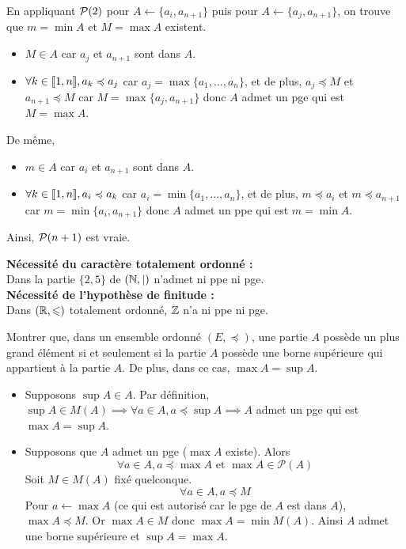 \documentclass{article}
\renewenvironment{question_kholle}[2][ ]
{
	\subsection{\texorpdfstring{#2}{}}
	\notblank{#1}
	{
		\noindent #1
		\bigbreak
	}
	{}
	\begin{proof}
}
{
	\end{proof}
}
\begin{document}
\begin{question_kholle}
\begin{itemize}
		      En appliquant $\mathcal P(2)$ pour $A\leftarrow \{a_{i}, a_{n+1}\}$ puis pour $A\leftarrow \{a_{j}, a_{n+1}\}$, on trouve que $m=\min A$ et $M=\max A$ existent.
		      \begin{itemize}
			      \item $M\in A$ car $a_{j}$ et $a_{n+1}$ sont dans $A$.
			      \item $\forall k\in[\![ 1,n ]\!], a_{k}\preccurlyeq a_{j}$ car $a_{j}=\max \{a_{1}, \dots , a_{n}\}$, et de plus, $a_{j}\preccurlyeq M$ et $a_{n+1}\preccurlyeq M$ car $M=\max\{a_{j}, a_{n+1}\}$ donc $A$ admet un pge qui est $M=\max A$.
		      \end{itemize}
		      De même,
		      \begin{itemize}
			      \item $m\in A$ car $a_{i}$ et $a_{n+1}$ sont dans $A$.
			      \item $\forall k\in[\![ 1,n ]\!], a_{i}\preccurlyeq a_{k}$ car $a_{i}=\min \{a_{1}, \dots , a_{n}\}$, et de plus, $m\preccurlyeq a_{i}$ et $m\preccurlyeq a_{n+1}$ car $m=\min\{a_{i}, a_{n+1}\}$ donc $A$ admet un ppe qui est $m=\min A$.
		      \end{itemize}
		      Ainsi, $\mathcal P(n+1)$ est vraie.
	\end{itemize}
	\vspace{1em}
	\textbf{Nécessité du caractère totalement ordonné :}\\
	Dans la partie $\{2,5\}$ de $(\mathbb N, |)$ n’admet ni ppe ni pge.\\[5pt]
	\textbf{Nécessité de l’hypothèse de finitude :}\\
	Dans $(\mathbb R, \leqslant)$ totalement ordonné, $\mathbb Z$ n’a ni ppe ni pge.
\end{question_kholle}

\begin{question_kholle}{Montrer que, dans un ensemble ordonné $(E,\preccurlyeq)$, une partie $A$ possède un plus grand élément si et seulement si la partie $A$ possède une borne supérieure qui appartient à la partie $A$. De plus, dans ce cas, $\max A = \sup A$.}
	\hfill\\
	\begin{itemize}
		\item Supposons $\sup A\in A$. Par définition, $\sup A\in M(A)\implies \forall a\in A, a\preccurlyeq \sup A \implies A$ admet un pge qui est $\max A=\sup A$.
		\item Supposons que $A$ admet un pge ($\max A$ existe). Alors
		      \[
			      \forall a\in A, a\preccurlyeq \max A \text{ et } \max A\in\mathcal{P}(A)
		      \]
		      Soit $M\in M(A)$ fixé quelconque.
		      \[
			      \forall a\in A, a\preccurlyeq M
		      \]
		      Pour $a\leftarrow \max A$ (ce qui est autorisé car le pge de $A$ est dans $A$), $\max A\preccurlyeq M$. Or $\max A\in M$ donc $\max A=\min M(A)$. Ainsi $A$ admet une borne supérieure et $\sup A=\max A$.
	\end{itemize}

\end{question_kholle}
\end{document}

